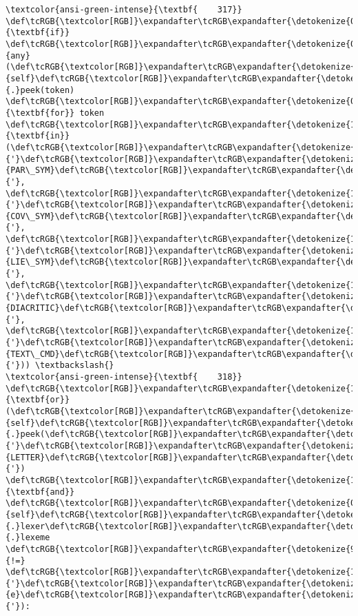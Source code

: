\documentclass[landscape,letterpaper,10pt,english]{article}
\begin{document}
\begin{Verbatim}[commandchars=\\\{\}, frame=single, framerule=2mm, rulecolor=\color{outerrorbackground}]
\textcolor{ansi-green-intense}{\textbf{    317}}     \def\tcRGB{\textcolor[RGB]}\expandafter\tcRGB\expandafter{\detokenize{0,135,0}}{\textbf{if}} \def\tcRGB{\textcolor[RGB]}\expandafter\tcRGB\expandafter{\detokenize{0,135,0}}{any}(\def\tcRGB{\textcolor[RGB]}\expandafter\tcRGB\expandafter{\detokenize{0,135,0}}{self}\def\tcRGB{\textcolor[RGB]}\expandafter\tcRGB\expandafter{\detokenize{98,98,98}}{.}peek(token) \def\tcRGB{\textcolor[RGB]}\expandafter\tcRGB\expandafter{\detokenize{0,135,0}}{\textbf{for}} token \def\tcRGB{\textcolor[RGB]}\expandafter\tcRGB\expandafter{\detokenize{175,0,255}}{\textbf{in}} (\def\tcRGB{\textcolor[RGB]}\expandafter\tcRGB\expandafter{\detokenize{175,0,0}}{'}\def\tcRGB{\textcolor[RGB]}\expandafter\tcRGB\expandafter{\detokenize{175,0,0}}{PAR\_SYM}\def\tcRGB{\textcolor[RGB]}\expandafter\tcRGB\expandafter{\detokenize{175,0,0}}{'}, \def\tcRGB{\textcolor[RGB]}\expandafter\tcRGB\expandafter{\detokenize{175,0,0}}{'}\def\tcRGB{\textcolor[RGB]}\expandafter\tcRGB\expandafter{\detokenize{175,0,0}}{COV\_SYM}\def\tcRGB{\textcolor[RGB]}\expandafter\tcRGB\expandafter{\detokenize{175,0,0}}{'}, \def\tcRGB{\textcolor[RGB]}\expandafter\tcRGB\expandafter{\detokenize{175,0,0}}{'}\def\tcRGB{\textcolor[RGB]}\expandafter\tcRGB\expandafter{\detokenize{175,0,0}}{LIE\_SYM}\def\tcRGB{\textcolor[RGB]}\expandafter\tcRGB\expandafter{\detokenize{175,0,0}}{'}, \def\tcRGB{\textcolor[RGB]}\expandafter\tcRGB\expandafter{\detokenize{175,0,0}}{'}\def\tcRGB{\textcolor[RGB]}\expandafter\tcRGB\expandafter{\detokenize{175,0,0}}{DIACRITIC}\def\tcRGB{\textcolor[RGB]}\expandafter\tcRGB\expandafter{\detokenize{175,0,0}}{'}, \def\tcRGB{\textcolor[RGB]}\expandafter\tcRGB\expandafter{\detokenize{175,0,0}}{'}\def\tcRGB{\textcolor[RGB]}\expandafter\tcRGB\expandafter{\detokenize{175,0,0}}{TEXT\_CMD}\def\tcRGB{\textcolor[RGB]}\expandafter\tcRGB\expandafter{\detokenize{175,0,0}}{'})) \textbackslash{}
\textcolor{ansi-green-intense}{\textbf{    318}}             \def\tcRGB{\textcolor[RGB]}\expandafter\tcRGB\expandafter{\detokenize{175,0,255}}{\textbf{or}} (\def\tcRGB{\textcolor[RGB]}\expandafter\tcRGB\expandafter{\detokenize{0,135,0}}{self}\def\tcRGB{\textcolor[RGB]}\expandafter\tcRGB\expandafter{\detokenize{98,98,98}}{.}peek(\def\tcRGB{\textcolor[RGB]}\expandafter\tcRGB\expandafter{\detokenize{175,0,0}}{'}\def\tcRGB{\textcolor[RGB]}\expandafter\tcRGB\expandafter{\detokenize{175,0,0}}{LETTER}\def\tcRGB{\textcolor[RGB]}\expandafter\tcRGB\expandafter{\detokenize{175,0,0}}{'}) \def\tcRGB{\textcolor[RGB]}\expandafter\tcRGB\expandafter{\detokenize{175,0,255}}{\textbf{and}} \def\tcRGB{\textcolor[RGB]}\expandafter\tcRGB\expandafter{\detokenize{0,135,0}}{self}\def\tcRGB{\textcolor[RGB]}\expandafter\tcRGB\expandafter{\detokenize{98,98,98}}{.}lexer\def\tcRGB{\textcolor[RGB]}\expandafter\tcRGB\expandafter{\detokenize{98,98,98}}{.}lexeme \def\tcRGB{\textcolor[RGB]}\expandafter\tcRGB\expandafter{\detokenize{98,98,98}}{!=} \def\tcRGB{\textcolor[RGB]}\expandafter\tcRGB\expandafter{\detokenize{175,0,0}}{'}\def\tcRGB{\textcolor[RGB]}\expandafter\tcRGB\expandafter{\detokenize{175,0,0}}{e}\def\tcRGB{\textcolor[RGB]}\expandafter\tcRGB\expandafter{\detokenize{175,0,0}}{'}):


\end{Verbatim}
\end{document}
